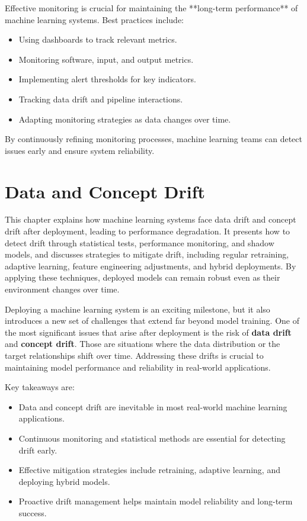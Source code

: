 \documentclass[12pt,openany]{book}
\begin{document}
Effective monitoring is crucial for maintaining the **long-term performance** of machine learning systems. Best practices include:

\begin{itemize}
    \item Using dashboards to track relevant metrics.
    \item Monitoring software, input, and output metrics.
    \item Implementing alert thresholds for key indicators.
    \item Tracking data drift and pipeline interactions.
    \item Adapting monitoring strategies as data changes over time.
\end{itemize}

By continuously refining monitoring processes, machine learning teams can detect issues early and ensure system reliability.




\chapter{Data and Concept Drift}

\begin{examplebox} 
This chapter explains how machine learning systems face data drift and concept drift after deployment, leading to performance degradation. It presents how to detect drift through statistical tests, performance monitoring, and shadow models, and discusses strategies to mitigate drift, including regular retraining, adaptive learning, feature engineering adjustments, and hybrid deployments. By applying these techniques, deployed models can remain robust even as their environment changes over time. 
\end{examplebox}

Deploying a machine learning system is an exciting milestone, but it also introduces a new set of challenges that extend far beyond model training. One of the most significant issues that arise after deployment is the risk of \textbf{data drift} and \textbf{concept drift}. Those are situations where the data distribution or the target relationships shift over time. Addressing these drifts is crucial to maintaining model performance and reliability in real-world applications. \newline

Key takeaways are:

\begin{itemize}
    \item Data and concept drift are inevitable in most real-world machine learning applications.
    \item Continuous monitoring and statistical methods are essential for detecting drift early.
    \item Effective mitigation strategies include retraining, adaptive learning, and deploying hybrid models.
    \item Proactive drift management helps maintain model reliability and long-term success.
\end{itemize}
\end{document}
